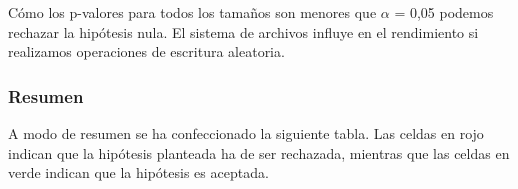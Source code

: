 Cómo los p-valores para todos los tamaños son menores que $\alpha$ = 0,05 podemos rechazar la hipótesis nula. El sistema de archivos influye en el rendimiento si realizamos operaciones de escritura aleatoria.

\newpage
\subsubsection{Resumen}

A modo de resumen se ha confeccionado la siguiente tabla. Las celdas en rojo indican que la hipótesis planteada ha de ser rechazada, mientras que las celdas en verde indican que la hipótesis es aceptada.

